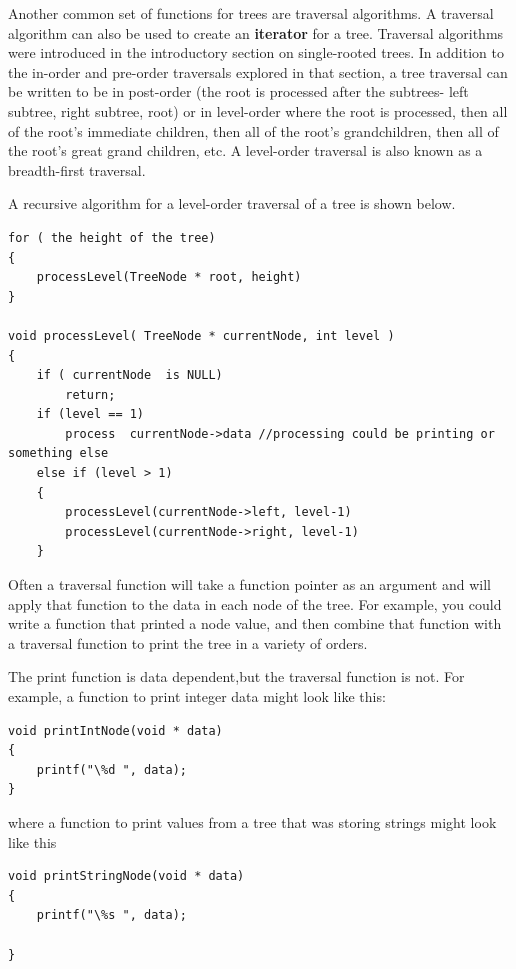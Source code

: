 Another common set of functions for trees are traversal algorithms.  A traversal algorithm can also be used to create an \textbf{iterator} for a tree. Traversal algorithms were introduced in the introductory section on single-rooted trees.  In addition to the  in-order and pre-order traversals explored in that section,  a tree traversal can be written to be in post-order (the root is processed after the subtrees- left subtree, right subtree, root)  or in level-order where the root is processed,  then all of the root's immediate children,   then all of the root's grandchildren,  then all of the root's great grand children, etc.  A level-order traversal is also known as a breadth-first traversal.

A recursive algorithm for a level-order traversal of a tree is shown below.   

\begin{lstlisting}
for ( the height of the tree)
{
    processLevel(TreeNode * root, height)
}

void processLevel( TreeNode * currentNode, int level )
{
    if ( currentNode  is NULL)
        return;
    if (level == 1)
        process  currentNode->data //processing could be printing or something else
    else if (level > 1)
    {
        processLevel(currentNode->left, level-1)
        processLevel(currentNode->right, level-1)
    }
\end{lstlisting}



Often a traversal function will take a function pointer as an argument
and will apply that function to the data in each node of the tree. For
example, you could write a function that printed a node value, and then
combine that function with a traversal function to print the tree in a
variety of orders. 

The print function is data dependent,but the traversal function is not.  
For example, a function to print  integer data might look like this:

\begin{lstlisting}
void printIntNode(void * data)
{
	printf("\%d ", data);
}

\end{lstlisting}

where a function to print values from a tree that was storing strings
might look like this

\begin{lstlisting}
void printStringNode(void * data)
{
	printf("\%s ", data);

}
\end{lstlisting}

